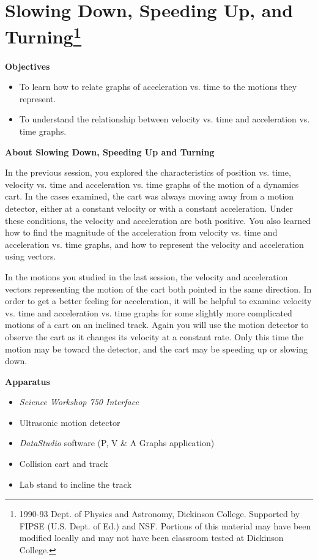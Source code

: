 
\section{Slowing Down, Speeding Up, and Turning\footnote{
1990-93 Dept. of Physics and Astronomy, Dickinson College. Supported by FIPSE
(U.S. Dept. of Ed.) and NSF. Portions of this material may have been modified
locally and may not have been classroom tested at Dickinson College.
}}

\makelabheader %

\medskip
\textbf{Objectives }

\begin{itemize}
\item To learn how to relate graphs of acceleration vs. time to the motions they represent. 
\item To understand the relationship between velocity vs. time and acceleration vs.
time graphs.
\end{itemize}

\medskip
\textbf{About Slowing Down, Speeding Up and Turning }

In the previous session, you explored the characteristics of position vs. time,
velocity vs. time and acceleration vs. time graphs of the motion of a dynamics
cart. In the cases examined, the cart was always moving away from a motion detector,
either at a constant velocity or with a constant acceleration. Under these conditions,
the velocity and acceleration are both positive. You also learned how to find
the magnitude of the acceleration from velocity vs. time and acceleration vs.
time graphs, and how to represent the velocity and acceleration using vectors. 

In the motions you studied in the last session, the velocity and acceleration
vectors representing the motion of the cart both pointed in the same direction.
In order to get a better feeling for acceleration, it will be helpful to examine
velocity vs. time and acceleration vs. time graphs for some slightly more complicated
motions of a cart on an inclined track. Again you will use the motion detector
to observe the cart as it changes its velocity at a constant rate. Only this
time the motion may be toward the detector, and the cart may be speeding up
or slowing down.

\medskip
\textbf{Apparatus }

\begin{itemize}
\item \textit{Science Workshop 750 Interface}
\item Ultrasonic motion detector 
\item \textit{DataStudio} software (P, V \& A Graphs application)
\item Collision cart and track 
\item Lab stand to incline the track
\end{itemize}

